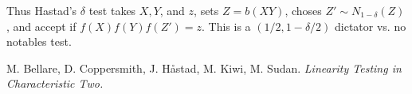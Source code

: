 Thus Hastad's $\delta$ test takes $X,Y$, and $z$, sets $Z = b(XY)$, choses $Z' \sim N_{1 - \delta}(Z)$, and accept if $f(X)f(Y)f(Z') = z$. This is a $(1/2, 1 - \delta/2)$ dictator vs. no notables test.








\begin{thebibliography}{9}

M. Bellare, D. Coppersmith, J. H\r{a}stad, M. Kiwi, M. Sudan.
\textit{Linearity Testing in Characteristic Two.}

\end{thebibliography}

